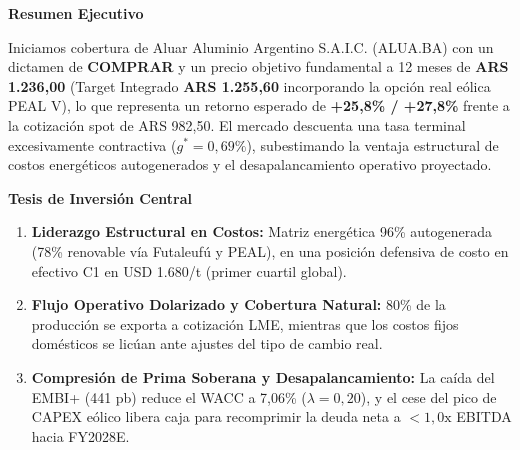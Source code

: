 \documentclass[10pt,a4paper]{article}
\newcommand{\coverheading}[1]{{\georgiahead\bfseries\color{gsnavy}\normalsize #1}\par\vspace{1pt}}
\begin{document}
\noindent
\begin{minipage}[t]{0.55\textwidth}
    \coverheading{Resumen Ejecutivo}
    {\small Iniciamos cobertura de Aluar Aluminio Argentino S.A.I.C. (ALUA.BA) con un dictamen de \textbf{COMPRAR} y un precio objetivo fundamental a 12 meses de \textbf{ARS 1.236,00} (Target Integrado \textbf{ARS 1.255,60} incorporando la opción real eólica PEAL V), lo que representa un retorno esperado de \textbf{+25,8\% / +27,8\%} frente a la cotización spot de ARS 982,50. El mercado descuenta una tasa terminal excesivamente contractiva ($g^* = 0,69\%$), subestimando la ventaja estructural de costos energéticos autogenerados y el desapalancamiento operativo proyectado.}

    \vspace{0.15cm}
    \coverheading{Tesis de Inversión Central}
    \begin{enumerate}
        \setlength{\itemsep}{2pt}
        \item \textbf{Liderazgo Estructural en Costos:} Matriz energética 96\% autogenerada (78\% renovable vía Futaleufú y PEAL), en una posición defensiva de costo en efectivo C1 en USD 1.680/t (primer cuartil global).
        \item \textbf{Flujo Operativo Dolarizado y Cobertura Natural:} 80\% de la producción se exporta a cotización LME, mientras que los costos fijos domésticos se licúan ante ajustes del tipo de cambio real.
        \item \textbf{Compresión de Prima Soberana y Desapalancamiento:} La caída del EMBI+ (441 pb) reduce el WACC a 7,06\% ($\lambda=0,20$), y el cese del pico de CAPEX eólico libera caja para recomprimir la deuda neta a $<1,0\text{x}$ EBITDA hacia FY2028E.
    \end{enumerate}
\end{minipage}%
\hfill
\end{document}
